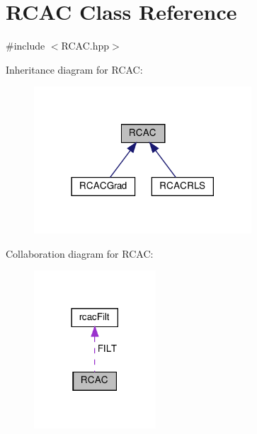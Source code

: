 \hypertarget{class_r_c_a_c}{}\section{R\+C\+AC Class Reference}
\label{class_r_c_a_c}


{\ttfamily \#include $<$R\+C\+A\+C.\+hpp$>$}



Inheritance diagram for R\+C\+AC\+:
\nopagebreak
\begin{figure}[H]
\begin{center}
\leavevmode
\includegraphics[width=230pt]{class_r_c_a_c__inherit__graph}
\end{center}
\end{figure}


Collaboration diagram for R\+C\+AC\+:
\nopagebreak
\begin{figure}[H]
\begin{center}
\leavevmode
\includegraphics[width=129pt]{class_r_c_a_c__coll__graph}
\end{center}
\end{figure}
